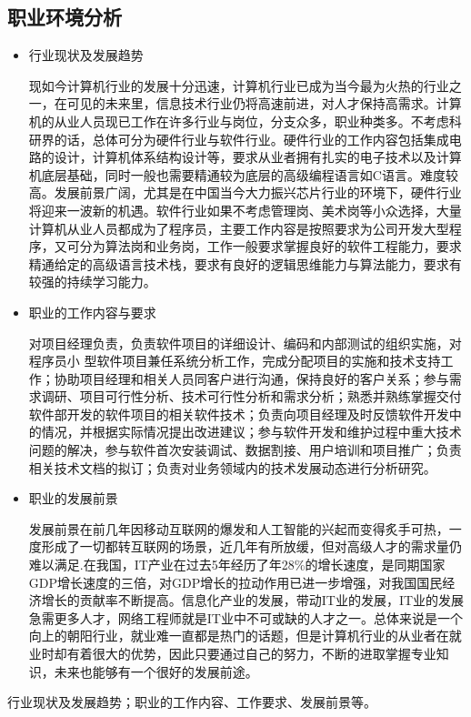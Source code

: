 \documentclass{article}
\begin{document}
\subsection{职业环境分析}
\begin{itemize}

\item 行业现状及发展趋势\par
现如今计算机行业的发展十分迅速，计算机行业已成为当今最为火热的行业之一，在可见的未来里，信息技术行业仍将高速前进，对人才保持高需求。计算机的从业人员现已工作在许多行业与岗位，分支众多，职业种类多。不考虑科研界的话，总体可分为硬件行业与软件行业。硬件行业的工作内容包括集成电路的设计，计算机体系结构设计等，要求从业者拥有扎实的电子技术以及计算机底层基础，同时一般也需要精通较为底层的高级编程语言如C语言。难度较高。发展前景广阔，尤其是在中国当今大力振兴芯片行业的环境下，硬件行业将迎来一波新的机遇。软件行业如果不考虑管理岗、美术岗等小众选择，大量计算机从业人员都成为了程序员，主要工作内容是按照要求为公司开发大型程序，又可分为算法岗和业务岗，工作一般要求掌握良好的软件工程能力，要求精通给定的高级语言技术栈，要求有良好的逻辑思维能力与算法能力，要求有较强的持续学习能力。
\item 职业的工作内容与要求\par
对项目经理负责，负责软件项目的详细设计、编码和内部测试的组织实施，对程序员小
型软件项目兼任系统分析工作，完成分配项目的实施和技术支持工作；协助项目经理和相关人员同客户进行沟通，保持良好的客户关系；参与需求调研、项目可行性分析、技术可行性分析和需求分析；熟悉并熟练掌握交付软件部开发的软件项目的相关软件技术；负责向项目经理及时反馈软件开发中的情况，并根据实际情况提出改进建议；参与软件开发和维护过程中重大技术问题的解决，参与软件首次安装调试、数据割接、用户培训和项目推广；负责相关技术文档的拟订；负责对业务领域内的技术发展动态进行分析研究。
\item 职业的发展前景\par
发展前景在前几年因移动互联网的爆发和人工智能的兴起而变得炙手可热，一度形成了一切都转互联网的场景，近几年有所放缓，但对高级人才的需求量仍难以满足.在我国，IT产业在过去5年经历了年28\%的增长速度，是同期国家GDP增长速度的三倍，对GDP增长的拉动作用已进一步增强，对我国国民经济增长的贡献率不断提高。信息化产业的发展，带动IT业的发展，IT业的发展急需更多人才，网络工程师就是IT业中不可或缺的人才之一。总体来说是一个向上的朝阳行业，就业难一直都是热门的话题，但是计算机行业的从业者在就业时却有着很大的优势，因此只要通过自己的努力，不断的进取掌握专业知识，未来也能够有一个很好的发展前途。
\end{itemize}
行业现状及发展趋势；职业的工作内容、工作要求、发展前景等。\par
\end{document}

